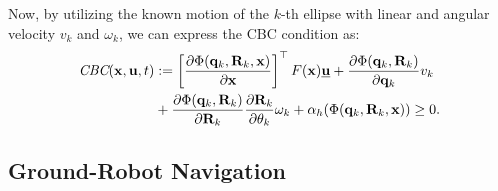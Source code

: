 Now, by utilizing the known motion of the $k$-th ellipse with linear and angular velocity $v_k$ and $\omega_k$, we can express the CBC condition as:
\begin{equation*}
\label{eq:tvcbc_explicit}
\begin{aligned}
\textit{CBC}(\mathbf{x},\mathbf{u}, t) & :=
\left[\frac{\partial \Phi(\mathbf{q}_k, \mathbf{R}_k, \mathbf{x})}{\partial \mathbf{x}} \right]^\top F(\mathbf{x})\underline{\mathbf{u}} + \frac{\partial \Phi(\mathbf{q}_k, \mathbf{R}_k)}{\partial \mathbf{q}_k} v_k \\
&+ \frac{\partial \Phi(\mathbf{q}_k, \mathbf{R}_k)}{\partial \mathbf{R}_k} \frac{\partial \mathbf{R}_k}{\partial \theta_k} \omega_k + \alpha_h(\Phi(\mathbf{q}_k, \mathbf{R}_k, \mathbf{x})) \geq 0.
\end{aligned}
\end{equation*}
%


\subsection{Ground-Robot Navigation}

